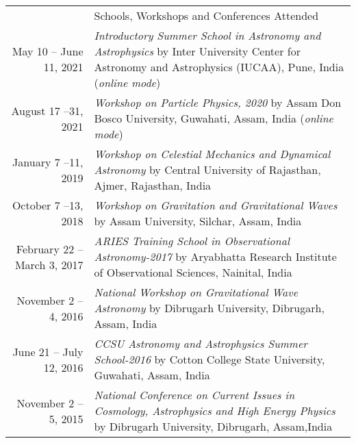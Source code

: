 \documentclass[a4paper, 11pt]{article}
\newcommand{\headingfont}{\Large\color{Bittersweet}}
\newenvironment{SectionTable}[1]{
	\renewcommand*{\arraystretch}{1.7}
	\setlength{\tabcolsep}{10pt}
	\begin{longtable}{Rp{5.2in}} & #1 \\}
{\end{longtable}\vspace{-.3cm}}
\begin{document}
\begin{SectionTable}{\headingfont Schools, Workshops and Conferences Attended}
May 10 -- June 11, 2021 &
\textit{Introductory Summer School in Astronomy and Astrophysics} by Inter University Center for Astronomy and Astrophysics (IUCAA), Pune, India (\textit{online mode})
\\

August 17 --31, 2021 &
\textit{Workshop on Particle Physics, 2020} by Assam Don Bosco University, Guwahati, Assam, India (\textit{online mode})
\\

January 7 --11, 2019 &
\textit{Workshop on Celestial Mechanics and Dynamical Astronomy} by Central University of Rajasthan, Ajmer, Rajasthan, India
\\

October 7 --13, 2018 &
\textit{Workshop on Gravitation and Gravitational Waves} by Assam University, Silchar, Assam, India
\\

February 22 -- March 3, 2017 &
\textit{ARIES Training School in Observational Astronomy-2017} by Aryabhatta Research Institute of Observational Sciences, Nainital, India
\\

November 2 -- 4, 2016 &
\textit{National Workshop on Gravitational Wave Astronomy} by Dibrugarh University, Dibrugarh, Assam, India
\\

June 21 -- July 12, 2016 &
\textit{CCSU Astronomy and Astrophysics Summer School-2016} by Cotton College State University, Guwahati, Assam, India
\\

November 2 -- 5, 2015 &
\textit{National Conference on Current Issues in Cosmology, Astrophysics and High Energy Physics} by Dibrugarh University, Dibrugarh, Assam,India
\\
\end{SectionTable}








\end{document}
